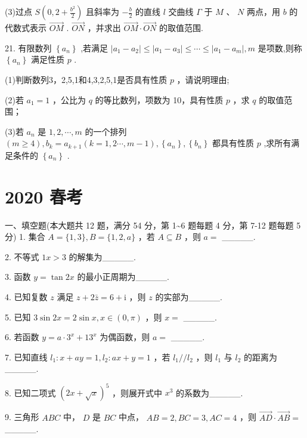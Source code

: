 \documentclass[10pt]{article}
\begin{document}
(3)过点 \(S\left( {0,2 + \frac{{b}^{2}}{2}}\right)\) 且斜率为 \(- \frac{b}{2}\) 的直线 \(l\) 交曲线 \(\Gamma\) 于 \(M\text{ 、 }N\) 两点，用 \(b\) 的代数式表示 \(\overrightarrow{OM}\) . \(\overrightarrow{ON}\) ，并求出 \(\overrightarrow{OM} \cdot  \overrightarrow{ON}\) 的取值范围.

21. 有限数列 \(\left\{  {a}_{n}\right\}\) ,若满足 \(\left| {{a}_{1} - {a}_{2}}\right|  \leq  \left| {{a}_{1} - {a}_{3}}\right|  \leq  \cdots  \leq  \left| {{a}_{1} - {a}_{m}}\right| ,m\) 是项数,则称 \(\left\{  {a}_{n}\right\}\) 满足性质 \(p\) .

(1)判断数列3，2,5,1和4,3,2,5,1是否具有性质 \(p\) ，请说明理由;

(2)若 \({a}_{1} = 1\) ，公比为 \(q\) 的等比数列，项数为 10，具有性质 \(p\) ，求 \(q\) 的取值范围；

(3)若 \({a}_{n}\) 是 \(1,2,\cdots ,m\) 的一个排列 \(\left( {m \geq  4}\right) ,{b}_{k} = {a}_{k + 1}\left( {k = 1,2\cdots ,m - 1}\right) ,\left\{  {a}_{n}\right\}  ,\left\{  {b}_{n}\right\}\) 都具有性质 \(p\) ,求所有满足条件的 \(\left\{  {a}_{n}\right\}\) .

\section*{2020 春考}

一、填空题(本大题共 12 题，满分 54 分，第 1\textasciitilde 6 题每题 4 分，第 7-12 题每题 5 分) 1. 集合 \(A = \{ 1,3\} ,B = \{ 1,2,a\}\) ，若 \(A \subseteq  B\) ，则 \(a =\) \_\_\_\_\_.

2. 不等式 \({1x} > 3\) 的解集为\_\_\_\_\_.

3. 函数 \(y = \tan {2x}\) 的最小正周期为\_\_\_\_\_.

4. 已知复数 \(z\) 满足 \(z + 2\bar{z} = 6 + \mathrm{i}\) ，则 \(z\) 的实部为\_\_\_\_\_.

5. 已知 \(3\sin {2x} = 2\sin x,x \in  \left( {0,\pi }\right)\) ，则 \(x =\) \_\_\_\_\_.

6. 若函数 \(y = a \cdot  {3}^{x} + {13}^{x}\) 为偶函数，则 \(a =\) \_\_\_\_\_.

7. 已知直线 \({l}_{1} : x + {ay} = 1,{l}_{2} : {ax} + y = 1\) ，若 \({l}_{1}//{l}_{2}\) ，则 \({l}_{1}\) 与 \({l}_{2}\) 的距离为\_\_\_\_\_.

8. 已知二项式 \({\left( 2x + \sqrt{x}\right) }^{5}\) ，则展开式中 \({x}^{3}\) 的系数为\_\_\_\_\_.

9. 三角形 \({ABC}\) 中， \(D\) 是 \({BC}\) 中点， \({AB} = 2,{BC} = 3,{AC} = 4\) ，则 \(\overrightarrow{AD} \cdot  \overrightarrow{AB} =\) \_\_\_\_\_.
\end{document}
